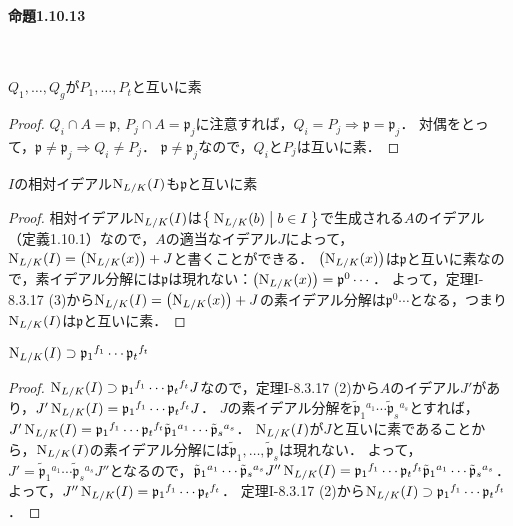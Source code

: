 \paragraph{命題1.10.13}~
\begin{screen}
  $Q_1,\ldots,Q_g$が$P_1,\ldots,P_t$と互いに素
\end{screen}
\begin{proof}
  $Q_i\cap A=\mathfrak{p}$, $P_j\cap A=\mathfrak{p}_j$に注意すれば，$Q_i=P_j \Rightarrow \mathfrak{p}=\mathfrak{p}_j$．
  対偶をとって，$\mathfrak{p}\neq\mathfrak{p}_j \Rightarrow Q_i\neq P_j$．
  $\mathfrak{p}\neq\mathfrak{p}_j$なので，$Q_i$と$P_j$は互いに素．
\end{proof}

\begin{screen}
  $I$の相対イデアル$\operatorname{N}_{L/K}(I)$も$\mathfrak{p}$と互いに素
\end{screen}
\begin{proof}
  相対イデアル$\operatorname{N}_{L/K}(I)$は$\Set{\operatorname{N}_{L/K}(b) | b\in I}$で生成される$A$のイデアル（定義1.10.1）なので，$A$の適当なイデアル$J$によって，$\operatorname{N}_{L/K}(I)=\left(\operatorname{N}_{L/K}(x)\right)+J$と書くことができる．
  $\left(\operatorname{N}_{L/K}(x)\right)$は$\mathfrak{p}$と互いに素なので，素イデアル分解には$\mathfrak{p}$は現れない：$\left(\operatorname{N}_{L/K}(x)\right)=\mathfrak{p}^0\cdots$．
  よって，定理I-8.3.17 (3)から$\operatorname{N}_{L/K}(I)=\left(\operatorname{N}_{L/K}(x)\right)+J$の素イデアル分解は$\mathfrak{p}^0\cdots$となる，つまり$\operatorname{N}_{L/K}(I)$は$\mathfrak{p}$と互いに素．
\end{proof}

\begin{screen}
  $\operatorname{N}_{L/K}(I)\supset\mathfrak{p}_1{}^{f_1}\cdots\mathfrak{p}_t{}^{f_t}$
\end{screen}
\begin{proof}
  $\operatorname{N}_{L/K}(I)\supset\mathfrak{p}_1{}^{f_1}\cdots\mathfrak{p}_t{}^{f_t}J$なので，定理I-8.3.17 (2)から$A$のイデアル$J'$があり，$J'\operatorname{N}_{L/K}(I)=\mathfrak{p}_1{}^{f_1}\cdots\mathfrak{p}_t{}^{f_t}J$．
  $J$の素イデアル分解を$\tilde{\mathfrak{p}}_1{}^{a_1}\cdots\tilde{\mathfrak{p}}_s{}^{a_s}$とすれば，$J'\operatorname{N}_{L/K}(I)=\mathfrak{p}_1{}^{f_1}\cdots\mathfrak{p}_t{}^{f_t}\tilde{\mathfrak{p}}_1{}^{a_1}\cdots\tilde{\mathfrak{p}}_s{}^{a_s}$．
  $\operatorname{N}_{L/K}(I)$が$J$と互いに素であることから，$\operatorname{N}_{L/K}(I)$の素イデアル分解には$\tilde{\mathfrak{p}}_1,\ldots,\tilde{\mathfrak{p}}_s$は現れない．
  よって，$J'=\tilde{\mathfrak{p}}_1{}^{a_1}\cdots\tilde{\mathfrak{p}}_s{}^{a_s}J''$となるので，$\tilde{\mathfrak{p}}_1{}^{a_1}\cdots\tilde{\mathfrak{p}}_s{}^{a_s}J''\operatorname{N}_{L/K}(I)=\mathfrak{p}_1{}^{f_1}\cdots\mathfrak{p}_t{}^{f_t}\tilde{\mathfrak{p}}_1{}^{a_1}\cdots\tilde{\mathfrak{p}}_s{}^{a_s}$．
  よって，$J''\operatorname{N}_{L/K}(I)=\mathfrak{p}_1{}^{f_1}\cdots\mathfrak{p}_t{}^{f_t}$．
  定理I-8.3.17 (2)から$\operatorname{N}_{L/K}(I)\supset\mathfrak{p}_1{}^{f_1}\cdots\mathfrak{p}_t{}^{f_t}$．
\end{proof}

